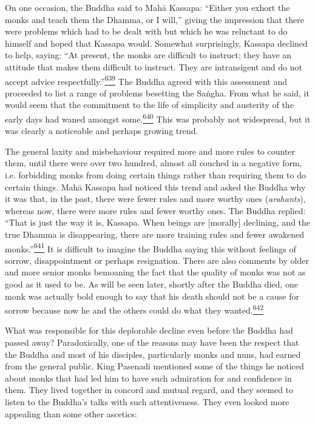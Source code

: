 On one occasion, the Buddha said to Mahā Kassapa: ``Either you exhort
the monks and teach them the Dhamma, or I will,'' giving the impression
that there were problems which had to be dealt with but which he was
reluctant to do himself and hoped that Kassapa would. Somewhat
surprisingly, Kassapa declined to help, saying: ``At present, the monks
are difficult to instruct; they have an attitude that makes them
difficult to instruct. They are intransigent and do not accept advice
respectfully.''\label{footprints_split_016.html_fnref639}\hyperref[footprints_split_025.htmlux5cux23fn639]{\textsuperscript{639}}
The Buddha agreed with this assessment and proceeded to list a range of
problems besetting the Saṅgha. From what he said, it would seem that the
commitment to the life of simplicity and austerity of the early days had
waned amongst
some.\label{footprints_split_016.html_fnref640}\hyperref[footprints_split_025.htmlux5cux23fn640]{\textsuperscript{640}}
This was probably not widespread, but it was clearly a noticeable and
perhaps growing trend.

The general laxity and misbehaviour required more and more rules to
counter them, until there were over two hundred, almost all couched in a
negative form, i.e. forbidding monks from doing certain things rather
than requiring them to do certain things. Mahā Kassapa had noticed this
trend and asked the Buddha why it was that, in the past, there were
fewer rules and more worthy ones (\emph{arahants}), whereas now, there
were more rules and fewer worthy ones. The Buddha replied: ``That is
just the way it is, Kassapa. When beings are {[}morally{]} declining,
and the true Dhamma is disappearing, there are more training rules and
fewer awakened
monks.''\label{footprints_split_016.html_fnref641}\hyperref[footprints_split_025.htmlux5cux23fn641]{\textsuperscript{641}}
It is difficult to imagine the Buddha saying this without feelings of
sorrow, disappointment or perhaps resignation. There are also comments
by older and more senior monks bemoaning the fact that the quality of
monks was not as good as it used to be. As will be seen later, shortly
after the Buddha died, one monk was actually bold enough to say that his
death should not be a cause for sorrow because now he and the others
could do what they
wanted.\label{footprints_split_016.html_fnref642}\hyperref[footprints_split_025.htmlux5cux23fn642]{\textsuperscript{642}}

What was responsible for this deplorable decline even before the Buddha
had passed away? Paradoxically, one of the reasons may have been the
respect that the Buddha and most of his disciples, particularly monks
and nuns, had earned from the general public. King Pasenadi mentioned
some of the things he noticed about monks that had led him to have such
admiration for and confidence in them. They lived together in concord
and mutual regard, and they seemed to listen to the Buddha's talks with
such attentiveness. They even looked more appealing than some other
ascetics:

